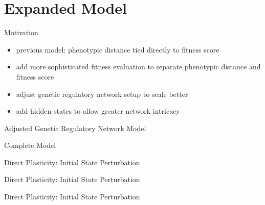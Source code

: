 \section{Expanded Model}

\begin{frame}{Motivation}
\begin{itemize}
  \item previous model: phenotypic distance tied directly to fitness score
  \item add more sophisticated fitness evaluation to separate phenotypic distance and fitness score
  \item adjust genetic regulatory network setup to scale better   \item add hidden states to allow greater network intricacy
\end{itemize}
\end{frame}


\begin{frame}{Adjusted Genetic Regulatory Network Model}

\end{frame}

\begin{frame}{Complete Model}

\end{frame}

\begin{frame}{Direct Plasticity: Initial State Perturbation}

\end{frame}

\begin{frame}{Direct Plasticity: Initial State Perturbation}

\end{frame}

\begin{frame}{Direct Plasticity: Initial State Perturbation}

\end{frame}

